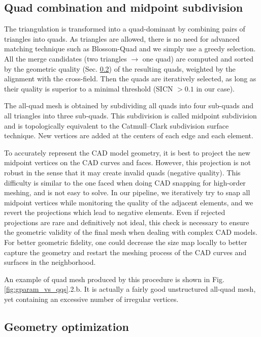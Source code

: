 \documentclass[AMA,STIX1COL]{WileyNJD-v2}
\newcommand\rsec[1]{Sec. \ref{#1}}
\newcommand\rfig[1]{Fig. \ref{#1}}
\begin{document}
{\subsection{Quad combination and midpoint subdivision}
\label{ss:combination}

The triangulation is transformed into a quad-dominant by combining
pairs of triangles into quads. As triangles are allowed, there is no
need for advanced matching technique such as Blossom-Quad \cite{blossom}
and we simply use a greedy selection. All the merge candidates (two triangles $\to$ one quad)
are computed and sorted by the geometric quality (\rsec{ss:geometry}) of the resulting quads, 
weighted by the alignment with the cross-field. Then the quads are
iteratively selected, as long as their quality is superior to a minimal
threshold (SICN $> 0.1$ in our case).

The all-quad mesh is obtained by subdividing all quads into four sub-quads and all
triangles into three sub-quads. This subdivision is called midpoint subdivision and 
is topologically equivalent to the Catmull–Clark subdivision surface technique.
New vertices are added at the centers of each edge and each element.

To accurately represent the CAD model geometry, it is best to project the new midpoint vertices
on the CAD curves and faces. However, this projection is not robust in the sense that it may
create invalid quads (negative quality). This difficulty is similar to the one faced when
doing CAD snapping for high-order meshing, and is not easy to solve.
In our pipeline, we iteratively try to snap all midpoint vertices while monitoring the quality
of the adjacent elements, and we revert the projections which lead to negative elements.
Even if rejected projections are rare and definitively not ideal, this check is necessary
to ensure the geometric validity of the final mesh when dealing with complex CAD models.
For better geometric fidelity, one could decrease the size map locally to better capture
the geometry and restart the meshing process of the CAD curves and surfaces in the neighborhood.

An example of quad mesh produced by this procedure is shown in
\rfig{fig:gparam_vs_qqs}.2.b. It is actually a fairly good unstructured all-quad mesh, yet
containing an excessive number of irregular vertices.


\subsection{Geometry optimization}
\label{ss:geometry}

}
\end{document}
